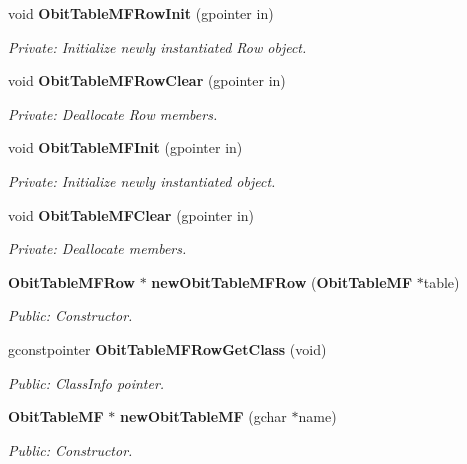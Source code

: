 \begin{CompactItemize}
\item 
void {\bf Obit\-Table\-MFRow\-Init} (gpointer in)
\begin{CompactList}\small\item\em Private: Initialize newly instantiated Row object. \item\end{CompactList}\item 
void {\bf Obit\-Table\-MFRow\-Clear} (gpointer in)
\begin{CompactList}\small\item\em Private: Deallocate Row members. \item\end{CompactList}\item 
void {\bf Obit\-Table\-MFInit} (gpointer in)
\begin{CompactList}\small\item\em Private: Initialize newly instantiated object. \item\end{CompactList}\item 
void {\bf Obit\-Table\-MFClear} (gpointer in)
\begin{CompactList}\small\item\em Private: Deallocate members. \item\end{CompactList}\item 
{\bf Obit\-Table\-MFRow} $\ast$ {\bf new\-Obit\-Table\-MFRow} ({\bf Obit\-Table\-MF} $\ast$table)
\begin{CompactList}\small\item\em Public: Constructor. \item\end{CompactList}\item 
gconstpointer {\bf Obit\-Table\-MFRow\-Get\-Class} (void)
\begin{CompactList}\small\item\em Public: Class\-Info pointer. \item\end{CompactList}\item 
{\bf Obit\-Table\-MF} $\ast$ {\bf new\-Obit\-Table\-MF} (gchar $\ast$name)
\begin{CompactList}\small\item\em Public: Constructor. \item\end{CompactList}\item 

\end{CompactItemize}
